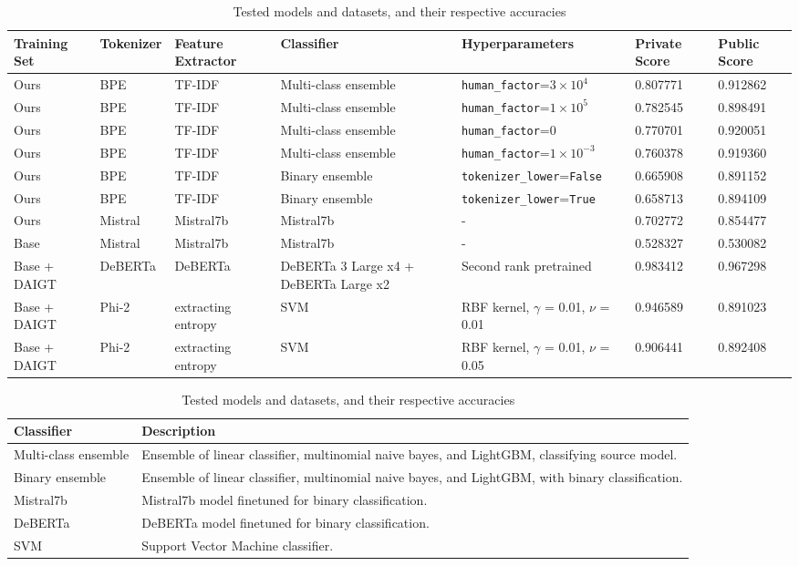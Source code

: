 \documentclass[conference]{IEEEtran}
\begin{document}
\begin{table}[htbp]
  \centering
  \caption{Tested models and datasets, and their respective accuracies}
  \label{tab:models}
  \begin{tabular}{p{1.8cm}p{1.5cm}p{2.3cm}p{2.8cm}p{3.6cm}p{1.6cm}p{1.6cm}}
    \hline
    \textbf{Training Set} & \textbf{Tokenizer} & \textbf{Feature Extractor} & \textbf{Classifier} & \textbf{Hyperparameters} & \textbf{Private Score} & \textbf{Public Score} \\
    \hline
    Ours & BPE & TF-IDF & Multi-class ensemble & \texttt{human\_factor}=$3 \times 10^4$ & 0.807771 & 0.912862 \\
    Ours & BPE & TF-IDF & Multi-class ensemble & \texttt{human\_factor}=$1 \times 10^5$ & 0.782545 & 0.898491 \\
    Ours & BPE & TF-IDF & Multi-class ensemble & \texttt{human\_factor}=$0$ & 0.770701 & 0.920051 \\
    Ours & BPE & TF-IDF & Multi-class ensemble & \texttt{human\_factor}=$1 \times 10^{-3}$ & 0.760378 & 0.919360 \\
    Ours & BPE & TF-IDF & Binary ensemble & \texttt{tokenizer\_lower}=\texttt{False} & 0.665908 & 0.891152 \\
    Ours & BPE & TF-IDF & Binary ensemble & \texttt{tokenizer\_lower}=\texttt{True} & 0.658713 & 0.894109 \\

    Ours & Mistral & Mistral7b & Mistral7b & - & 0.702772 & 0.854477 \\
    Base & Mistral & Mistral7b & Mistral7b & - & 0.528327 & 0.530082 \\

    Base + DAIGT & DeBERTa & DeBERTa & DeBERTa 3 Large x4 + DeBERTa Large x2 & Second rank pretrained & 0.983412 & 0.967298 \\
    Base + DAIGT & Phi-2 & extracting entropy & SVM & RBF kernel, $\gamma$ = 0.01, $\nu$ = 0.01 & 0.946589 & 0.891023 \\
    Base + DAIGT & Phi-2 & extracting entropy & SVM & RBF kernel, $\gamma$ = 0.01, $\nu$ = 0.05 & 0.906441 & 0.892408 \\

    \hline
  \end{tabular}

  \vspace{0.5cm}

  \begin{tabular}{ll}
    \hline
    \textbf{Classifier} & \textbf{Description} \\
    \hline
    Multi-class ensemble & Ensemble of linear classifier, multinomial naive bayes, and LightGBM, classifying source model. \\
    Binary ensemble & Ensemble of linear classifier, multinomial naive bayes, and LightGBM, with binary classification. \\
    Mistral7b & Mistral7b model finetuned for binary classification. \\
    DeBERTa & DeBERTa model finetuned for binary classification. \\
    SVM & Support Vector Machine classifier. \\
    \hline
  \end{tabular}


\end{table}
\end{document}
